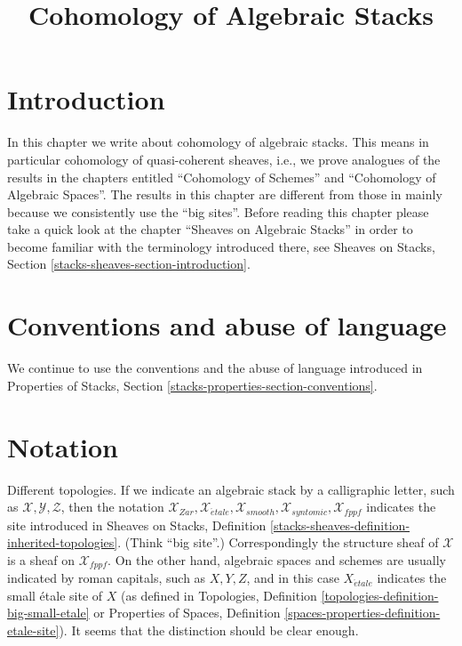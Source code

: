 \documentclass{stacks-project}
\theoremstyle{plain}
\theoremstyle{definition}
\theoremstyle{remark}
\numberwithin{equation}{subsection}
\def\etale{{\acute{e}tale}}
\begin{document}
\title{Cohomology of Algebraic Stacks}

\maketitle

\label{section-phantom}

\tableofcontents




\section{Introduction}
\label{section-introduction}

\noindent
In this chapter we write about cohomology of algebraic stacks.
This means in particular cohomology of quasi-coherent sheaves, i.e.,
we prove analogues of the results in the chapters entitled
``Cohomology of Schemes'' and ``Cohomology of Algebraic Spaces''.
The results in this chapter are different
from those in \cite{LM-B} mainly because we consistently use the
``big sites''. Before reading this chapter please take a quick look at
the chapter ``Sheaves on Algebraic Stacks'' in order to become
familiar with the terminology introduced there, see
Sheaves on Stacks, Section \ref{stacks-sheaves-section-introduction}.



\section{Conventions and abuse of language}
\label{section-conventions}

\noindent
We continue to use the conventions and the abuse of language
introduced in
Properties of Stacks, Section \ref{stacks-properties-section-conventions}.











\section{Notation}
\label{section-notation}

\noindent
Different topologies. If we indicate an algebraic stack by a calligraphic
letter, such as $\mathcal{X}, \mathcal{Y}, \mathcal{Z}$, then the notation
$\mathcal{X}_{Zar}, \mathcal{X}_\etale, \mathcal{X}_{smooth},
\mathcal{X}_{syntomic}, \mathcal{X}_{fppf}$ indicates the site introduced
in
Sheaves on Stacks, Definition
\ref{stacks-sheaves-definition-inherited-topologies}.
(Think ``big site''.) Correspondingly the structure sheaf of
$\mathcal{X}$ is a sheaf on $\mathcal{X}_{fppf}$.
On the other hand, algebraic spaces and schemes
are usually indicated by roman capitals, such as $X, Y, Z$, and in this case
$X_\etale$ indicates the small \'etale site of $X$ (as
defined in
Topologies, Definition
\ref{topologies-definition-big-small-etale}
or
Properties of Spaces, Definition
\ref{spaces-properties-definition-etale-site}).
It seems that the distinction should be clear enough.
\end{document}

